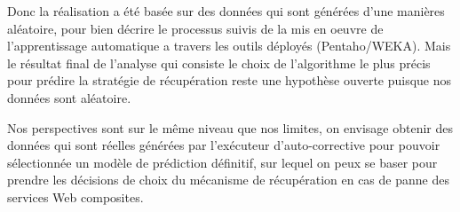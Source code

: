 Donc la réalisation a été basée sur des données qui sont générées d'une manières aléatoire, pour bien décrire le processus suivis de la mis en oeuvre de l'apprentissage automatique a travers les outils déployés (Pentaho/WEKA).
Mais le résultat final de l'analyse qui consiste le choix de l'algorithme le plus précis pour prédire la stratégie de récupération reste une hypothèse ouverte puisque nos données sont aléatoire.
 
Nos perspectives sont sur le même niveau que nos limites, on envisage obtenir des données qui sont réelles générées par l'exécuteur d'auto-corrective pour pouvoir sélectionnée un modèle de prédiction définitif, sur lequel on peux se baser pour prendre les décisions de choix du mécanisme de récupération en cas de panne des services Web composites.


